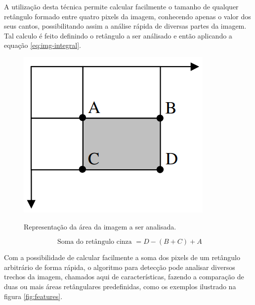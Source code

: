 A utilização desta técnica permite calcular facilmente o tamanho de qualquer retângulo formado entre quatro pixels da imagem, conhecendo apenas o valor dos seus cantos, possibilitando assim a análise rápida de diversas partes da imagem. Tal calculo é feito definindo o retângulo a ser análisado e então aplicando a equação \ref{eq:img-integral}.

\begin{figure}[htb]
    \centering
    \caption{Representação da área da imagem a ser analisada.}
    \includegraphics[scale=.4]{figs/imagem-integral-calculo.png}
    \label{fig:integral-calculo}
 \end{figure}

 \begin{equation}\label{eq:img-integral}
    \text{ Soma do retângulo cinza } = D - (B + C) + A
\end{equation}

Com a possibilidade de calcular facilmente a soma dos pixels de um retângulo arbitrário de forma rápida, o algoritmo para detecção pode analisar diversos trechos da imagem, chamados aqui de características, fazendo a comparação de duas ou mais áreas retângulares predefinidas, como os exemplos ilustrado na figura \ref{fig:features}. 

